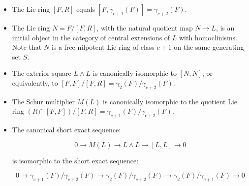 \begin{itemize}
\item The Lie ring $[F,R]$ equals $[F,\gamma_{c+1}(F)] = \gamma_{c+2}(F)$.
\item The Lie ring $N = F/[F,R]$, with the natural quotient map $N \to
  L$, is an initial object in the category of central extensions of
  $L$ with homoclinisms. Note that $N$ is a free nilpotent Lie ring of
  class $c + 1$ on the same generating set $S$.
\item The exterior square $L \wedge L$ is canonically isomorphic to
  $[N,N]$, or equivalently, to $[F,F]/[F,R] =
  \gamma_2(F)/\gamma_{c+2}(F)$.
\item The Schur multiplier $M(L)$ is canonically isomorphic to the
  quotient Lie ring $(R \cap [F,F])/[F,R] =
  \gamma_{c+1}(F)/\gamma_{c+2}(F)$.
\item The canonical short exact sequence:

  $$0 \to M(L) \to L \wedge L \to [L,L] \to 0$$

  is isomorphic to the short exact sequence:
  
  $$0 \to \gamma_{c+1}(F)/\gamma_{c+2}(F) \to \gamma_2(F)/\gamma_{c+2}(F) \to \gamma_2(F)/\gamma_{c+1}(F) \to 0$$

\end{itemize}
